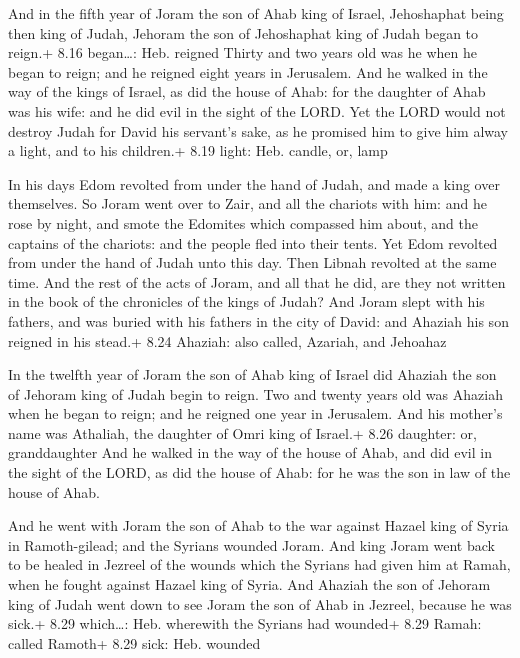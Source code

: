  And in the fifth year of Joram the son of Ahab king of
Israel, Jehoshaphat being then king of Judah, Jehoram the son of
Jehoshaphat king of Judah began to reign.+ 8.16 began\ldots: Heb.
reigned  Thirty and two years old was he when he began to
reign; and he reigned eight years in Jerusalem.  And he
walked in the way of the kings of Israel, as did the house of Ahab: for
the daughter of Ahab was his wife: and he did evil in the sight of the
LORD.  Yet the LORD would not destroy Judah for David his
servant's sake, as he promised him to give him alway a light, and to his
children.+ 8.19 light: Heb. candle, or, lamp

 In his days Edom revolted from under the hand of Judah,
and made a king over themselves.  So Joram went over to
Zair, and all the chariots with him: and he rose by night, and smote the
Edomites which compassed him about, and the captains of the chariots:
and the people fled into their tents.  Yet Edom revolted
from under the hand of Judah unto this day. Then Libnah revolted at the
same time.  And the rest of the acts of Joram, and all that
he did, are they not written in the book of the chronicles of the kings
of Judah?  And Joram slept with his fathers, and was buried
with his fathers in the city of David: and Ahaziah his son reigned in
his stead.+ 8.24 Ahaziah: also called, Azariah, and Jehoahaz

 In the twelfth year of Joram the son of Ahab king of
Israel did Ahaziah the son of Jehoram king of Judah begin to reign.
 Two and twenty years old was Ahaziah when he began to
reign; and he reigned one year in Jerusalem. And his mother's name was
Athaliah, the daughter of Omri king of Israel.+ 8.26 daughter: or,
granddaughter  And he walked in the way of the house of
Ahab, and did evil in the sight of the LORD, as did the house of Ahab:
for he was the son in law of the house of Ahab.

 And he went with Joram the son of Ahab to the war
against Hazael king of Syria in Ramoth-gilead; and the Syrians wounded
Joram.  And king Joram went back to be healed in Jezreel of
the wounds which the Syrians had given him at Ramah, when he fought
against Hazael king of Syria. And Ahaziah the son of Jehoram king of
Judah went down to see Joram the son of Ahab in Jezreel, because he was
sick.+ 8.29 which\ldots: Heb. wherewith the Syrians had wounded+ 8.29
Ramah: called Ramoth+ 8.29 sick: Heb. wounded

